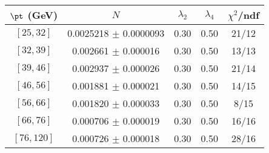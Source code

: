 \begin{tabular}{c||c|c|c|c}
$\pt$ (GeV) & $N$ & $\lambda_{2}$ & $\lambda_4$  & $\chi^2$/ndf  \\
\hline
$[25, 32]$ & 0.0025218 $\pm$ 0.0000093 & 0.30 & 0.50 & 21/12\\
$[32, 39]$ & 0.002661 $\pm$ 0.000016 & 0.30 & 0.50 & 13/13\\
$[39, 46]$ & 0.002937 $\pm$ 0.000026 & 0.30 & 0.50 & 21/14\\
$[46, 56]$ & 0.001881 $\pm$ 0.000021 & 0.30 & 0.50 & 14/15\\
$[56, 66]$ & 0.001820 $\pm$ 0.000033 & 0.30 & 0.50 & 8/15\\
$[66, 76]$ & 0.000706 $\pm$ 0.000019 & 0.30 & 0.50 & 16/16\\
$[76, 120]$ & 0.000726 $\pm$ 0.000018 & 0.30 & 0.50 & 28/16\\
\end{tabular}
